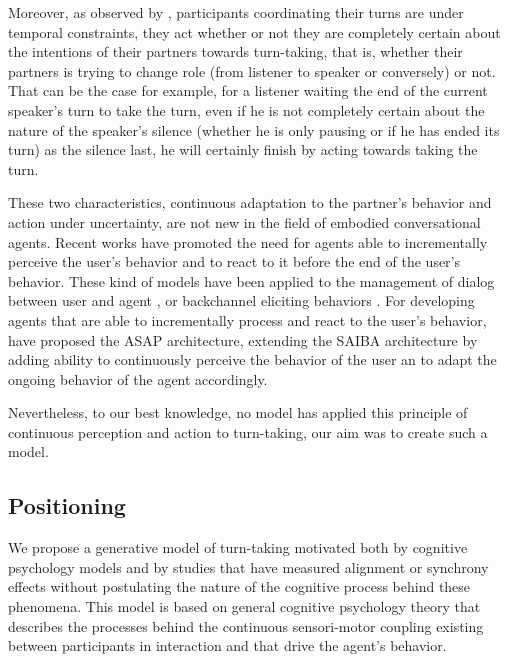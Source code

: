 Moreover, as observed by \cite{thorisson_natural_2002}, participants coordinating their turns are under temporal constraints, they act whether or not they are completely certain about the intentions of their partners towards turn-taking, that is, whether their partners is trying to change role (from listener to speaker or conversely) or not. That can be the case for example, for a listener waiting the end of the current speaker's turn to take the turn, even if he is not completely certain about the nature of the speaker's silence (whether he is only pausing or if he has ended its turn) as the silence last, he will certainly finish by acting towards taking the turn.
 	
 These two characteristics, continuous adaptation to the partner's behavior and action under uncertainty, are not new in the field of embodied conversational agents. Recent works have promoted the need for agents able to incrementally perceive the user's behavior and to react to it before the end of the user's behavior. These kind of models have been applied to the management of dialog between user and agent \cite{skantze_towards_2010}, or backchannel eliciting behaviors \cite{buschmeier_when_2014}. For developing agents that are able to incrementally process and react to the user's behavior, \cite{kopp_architecture_2014} have proposed the ASAP architecture, extending the SAIBA architecture by adding ability to continuously perceive the behavior of the user an to adapt the ongoing behavior of the agent accordingly. 
 
 Nevertheless, to our best knowledge, no model has applied this principle of continuous perception and action to turn-taking, our aim was to create such a model. 

\subsection{Positioning}

We propose a generative model of turn-taking motivated both by cognitive psychology models and by studies
that have measured alignment or synchrony effects without postulating the nature of the cognitive process
behind these phenomena. This model is based on general cognitive psychology theory that describes the
processes behind the continuous sensori-motor coupling existing between participants in interaction and that
drive the agent's behavior.



